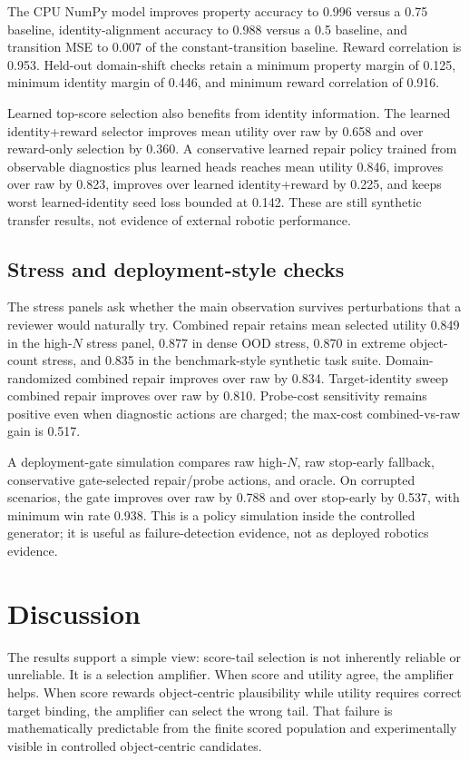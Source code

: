 \documentclass[10pt]{article}
\begin{document}
The CPU NumPy model improves property accuracy to 0.996 versus a 0.75 baseline, identity-alignment accuracy to 0.988 versus a 0.5 baseline, and transition MSE to 0.007 of the constant-transition baseline. Reward correlation is 0.953. Held-out domain-shift checks retain a minimum property margin of 0.125, minimum identity margin of 0.446, and minimum reward correlation of 0.916.

Learned top-score selection also benefits from identity information. The learned identity+reward selector improves mean utility over raw by 0.658 and over reward-only selection by 0.360. A conservative learned repair policy trained from observable diagnostics plus learned heads reaches mean utility 0.846, improves over raw by 0.823, improves over learned identity+reward by 0.225, and keeps worst learned-identity seed loss bounded at 0.142. These are still synthetic transfer results, not evidence of external robotic performance.

\subsection{Stress and deployment-style checks}

The stress panels ask whether the main observation survives perturbations that a reviewer would naturally try. Combined repair retains mean selected utility 0.849 in the high-$N$ stress panel, 0.877 in dense OOD stress, 0.870 in extreme object-count stress, and 0.835 in the benchmark-style synthetic task suite. Domain-randomized combined repair improves over raw by 0.834. Target-identity sweep combined repair improves over raw by 0.810. Probe-cost sensitivity remains positive even when diagnostic actions are charged; the max-cost combined-vs-raw gain is 0.517.

A deployment-gate simulation compares raw high-$N$, raw stop-early fallback, conservative gate-selected repair/probe actions, and oracle. On corrupted scenarios, the gate improves over raw by 0.788 and over stop-early by 0.537, with minimum win rate 0.938. This is a policy simulation inside the controlled generator; it is useful as failure-detection evidence, not as deployed robotics evidence.

\section{Discussion}

The results support a simple view: score-tail selection is not inherently reliable or unreliable. It is a selection amplifier. When score and utility agree, the amplifier helps. When score rewards object-centric plausibility while utility requires correct target binding, the amplifier can select the wrong tail. That failure is mathematically predictable from the finite scored population and experimentally visible in controlled object-centric candidates.
\end{document}
